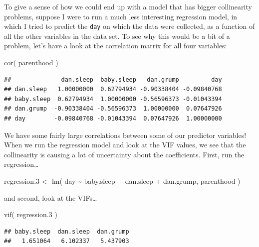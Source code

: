 \documentclass[
]{book}
\newenvironment{Shaded}{\begin{snugshade}}{\end{snugshade}}
\newcommand{\FloatTok}[1]{\textcolor[rgb]{0.00,0.00,0.81}{#1}}
\newcommand{\FunctionTok}[1]{\textcolor[rgb]{0.00,0.00,0.00}{#1}}
\newcommand{\NormalTok}[1]{#1}
\newcommand{\OtherTok}[1]{\textcolor[rgb]{0.56,0.35,0.01}{#1}}
\newcommand{\SpecialCharTok}[1]{\textcolor[rgb]{0.00,0.00,0.00}{#1}}
\begin{document}
To give a sense of how we could end up with a model that has bigger collinearity problems, suppose I were to run a much less interesting regression model, in which I tried to predict the \texttt{day} on which the data were collected, as a function of all the other variables in the data set. To see why this would be a bit of a problem, let's have a look at the correlation matrix for all four variables:

\begin{Shaded}
\begin{Highlighting}[]
\FunctionTok{cor}\NormalTok{( parenthood )}
\end{Highlighting}
\end{Shaded}

\begin{verbatim}
##              dan.sleep  baby.sleep   dan.grump         day
## dan.sleep   1.00000000  0.62794934 -0.90338404 -0.09840768
## baby.sleep  0.62794934  1.00000000 -0.56596373 -0.01043394
## dan.grump  -0.90338404 -0.56596373  1.00000000  0.07647926
## day        -0.09840768 -0.01043394  0.07647926  1.00000000
\end{verbatim}

We have some fairly large correlations between some of our predictor variables! When we run the regression model and look at the VIF values, we see that the collinearity is causing a lot of uncertainty about the coefficients. First, run the regression\ldots{}

\begin{Shaded}
\begin{Highlighting}[]
\NormalTok{regression}\FloatTok{.3} \OtherTok{\textless{}{-}} \FunctionTok{lm}\NormalTok{( day }\SpecialCharTok{\textasciitilde{}}\NormalTok{ baby.sleep }\SpecialCharTok{+}\NormalTok{ dan.sleep }\SpecialCharTok{+}\NormalTok{ dan.grump, parenthood )}
\end{Highlighting}
\end{Shaded}

and second, look at the VIFs\ldots{}

\begin{Shaded}
\begin{Highlighting}[]
\FunctionTok{vif}\NormalTok{( regression}\FloatTok{.3}\NormalTok{ )}
\end{Highlighting}
\end{Shaded}

\begin{verbatim}
## baby.sleep  dan.sleep  dan.grump 
##   1.651064   6.102337   5.437903
\end{verbatim}
\end{document}
